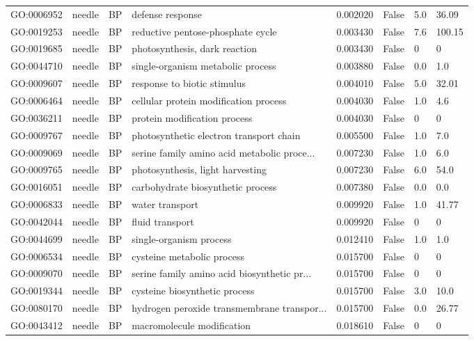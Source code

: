 \begin{longtable}{llllrl}
GO:0006952 & needle & BP &   defense response  & 0.002020 &   False  & 5.0 & 36.09 \\ 
GO:0019253 & needle & BP &   reductive pentose-phosphate cycle  & 0.003430 &   False  & 7.6 & 100.15 \\ 
GO:0019685 & needle & BP &   photosynthesis, dark reaction  & 0.003430 &   False  & 0 & 0 \\
GO:0044710 & needle & BP &   single-organism metabolic process  & 0.003880 &   False  & 0.0 & 1.0 \\ 
GO:0009607 & needle & BP &   response to biotic stimulus  & 0.004010 &   False  & 5.0 & 32.01 \\ 
GO:0006464 & needle & BP &   cellular protein modification process  & 0.004030 &   False  & 1.0 & 4.6 \\ 
GO:0036211 & needle & BP &   protein modification process  & 0.004030 &   False  & 0 & 0 \\
GO:0009767 & needle & BP &   photosynthetic electron transport chain  & 0.005500 &   False  & 1.0 & 7.0 \\ 
GO:0009069 & needle & BP &   serine family amino acid metabolic proce...  & 0.007230 &   False  & 1.0 & 6.0 \\ 
GO:0009765 & needle & BP &   photosynthesis, light harvesting  & 0.007230 &   False  & 6.0 & 54.0 \\ 
GO:0016051 & needle & BP &   carbohydrate biosynthetic process  & 0.007380 &   False  & 0.0 & 0.0 \\ 
GO:0006833 & needle & BP &   water transport  & 0.009920 &   False  & 1.0 & 41.77 \\ 
GO:0042044 & needle & BP &   fluid transport  & 0.009920 &   False  & 0 & 0 \\
GO:0044699 & needle & BP &   single-organism process  & 0.012410 &   False  & 1.0 & 1.0 \\ 
GO:0006534 & needle & BP &   cysteine metabolic process  & 0.015700 &   False  & 0 & 0 \\
GO:0009070 & needle & BP &   serine family amino acid biosynthetic pr...  & 0.015700 &   False  & 0 & 0 \\
GO:0019344 & needle & BP &   cysteine biosynthetic process  & 0.015700 &   False  & 3.0 & 10.0 \\ 
GO:0080170 & needle & BP &   hydrogen peroxide transmembrane transpor...  & 0.015700 &   False  & 0.0 & 26.77 \\ 
GO:0043412 & needle & BP &   macromolecule modification  & 0.018610 &   False  & 0 & 0 \\

\end{longtable}
